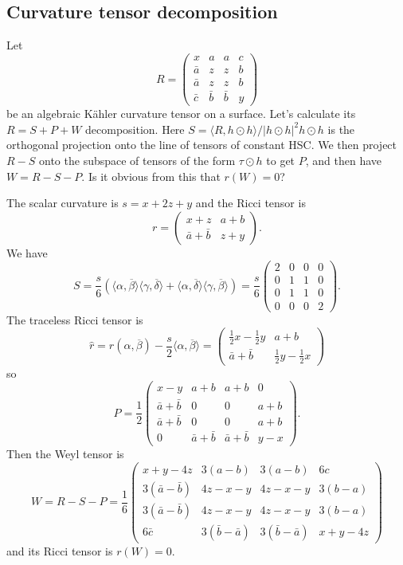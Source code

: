 \documentclass[11pt]{amsart}
\theoremstyle{definition}
\def\ov#1{\overline{#1}}
\def\<{\langle}
\def\>{\rangle}
\begin{document}
\subsection*{Curvature tensor decomposition}

Let
$$
R = \begin{pmatrix}
x & a & a & c
\\
\bar a & z & z & b
\\
\bar a & z & z & b
\\
\bar c & \bar b & \bar b & y
\end{pmatrix}
$$
be an algebraic K\"ahler curvature tensor on a surface.
Let's calculate its $R = S + P + W$ decomposition.
Here $S = \<R, h \odot h \> / |h \odot h|^2 h \odot h$ is the orthogonal
projection onto the line of tensors of constant HSC.
We then project $R - S$ onto the subspace of tensors of the form $\tau \odot h$
to get $P$, and then have $W = R - S - P$.
Is it obvious from this that $r(W) = 0$?

The scalar curvature is $s = x + 2z + y$ and the Ricci tensor is
$$
r = \begin{pmatrix}
x + z & a + b
\\
\bar a + \bar b & z + y
\end{pmatrix}.
$$
We have
$$
S = \frac{s}{6}(\<\alpha, \ov \beta\> \<\gamma, \ov \delta\>
+ \<\alpha, \ov \delta\> \<\gamma, \ov \beta\>)
= \frac{s}{6}
\begin{pmatrix}
2 & 0 & 0 & 0
\\
0 & 1 & 1 & 0
\\
0 & 1 & 1 & 0
\\
0 & 0 & 0 & 2
\end{pmatrix}.
$$
The traceless Ricci tensor is
$$
\hat r
= r(\alpha, \ov\beta) - \frac{s}{2} \<\alpha, \ov\beta\>
= \begin{pmatrix}
\frac12 x - \frac12 y & a + b
\\
\bar a + \bar b & \frac12 y - \frac12 x
\end{pmatrix}
$$
so
$$
P = \frac12
\begin{pmatrix}
x-y & a+b & a+b & 0
\\
\bar a + \bar b & 0 & 0 & a+b
\\
\bar a + \bar b & 0 & 0 & a+b
\\
0 & \bar a+\bar b & \bar a+\bar b & y-x
\end{pmatrix}.
$$
Then the Weyl tensor is
$$
W\! = R - S - P
= \frac16 \! \begin{pmatrix}
x + y - 4z & 3(a - b) & 3(a - b) & 6c
\\
3(\bar a - \bar b) & 4z - x - y & 4z - x - y & 3(b - a)
\\
3(\bar a - \bar b) & 4z - x - y & 4z - x - y & 3(b - a)
\\
6 \bar c & 3(\bar b - \bar a) & 3(\bar b - \bar a) & x + y - 4z
\end{pmatrix}
$$
and its Ricci tensor is $r(W) = 0$.
\end{document}
